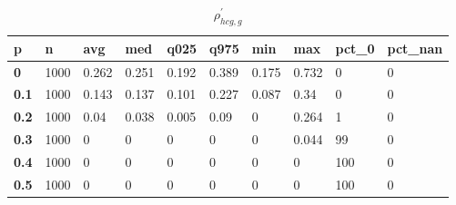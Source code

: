 \begin{table}[h]
 \centering 
\footnotesize
\caption{$\rho_{hcg,g}^\prime $}
\label{tab:alphahcgg}
\begin{tabular}[h]{|l|l|l|l|l|l|l|l|l|l|
    } \hline
\textbf{ p} & \textbf{ n} & \textbf{ avg} & \textbf{ med} & \textbf{ q025} & \textbf{ q975} & \textbf{ min} & \textbf{ max} & \textbf{ pct\_0} & \textbf{ pct\_nan}
    \\ \hline
  \textbf{  0} & 1000 & 0.262 & 0.251 & 0.192 & 0.389 & 0.175 & 0.732 &   0 & 0
    \\ \hline
  \textbf{0.1} & 1000 & 0.143 & 0.137 & 0.101 & 0.227 & 0.087 &  0.34 &   0 & 0
    \\ \hline
  \textbf{0.2} & 1000 &  0.04 & 0.038 & 0.005 &  0.09 &     0 & 0.264 &   1 & 0
    \\ \hline
  \textbf{0.3} & 1000 &     0 &     0 &     0 &     0 &     0 & 0.044 &  99 & 0
    \\ \hline
  \textbf{0.4} & 1000 &     0 &     0 &     0 &     0 &     0 &     0 & 100 & 0
    \\ \hline
  \textbf{0.5} & 1000 &     0 &     0 &     0 &     0 &     0 &     0 & 100 & 0
    \\ \hline
 \end{tabular}
 \end{table}
